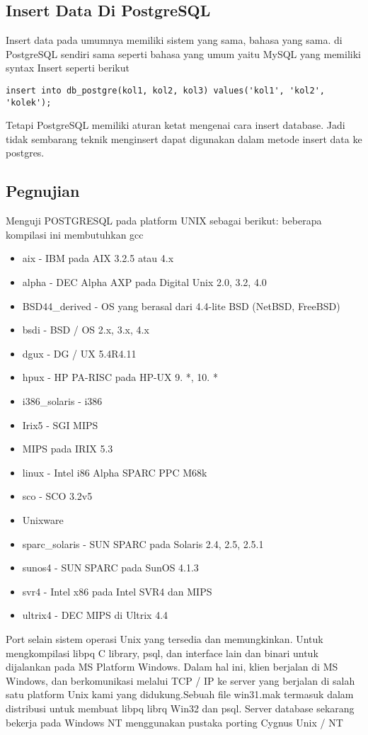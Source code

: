 \subsection{Insert Data Di PostgreSQL}
Insert data pada umumnya memiliki sistem yang sama, bahasa yang sama. di PostgreSQL sendiri sama seperti bahasa yang umum yaitu MySQL yang memiliki syntax Insert seperti berikut
\begin{verbatim}
insert into db_postgre(kol1, kol2, kol3) values('kol1', 'kol2', 'kolek');
\end{verbatim}
Tetapi PostgreSQL memiliki aturan ketat mengenai cara insert database. Jadi tidak sembarang teknik menginsert dapat digunakan dalam metode insert data ke postgres.

\subsection{Pegnujian}
Menguji POSTGRESQL pada platform UNIX sebagai berikut: 
beberapa kompilasi ini membutuhkan gcc
\begin {itemize} 
	\item aix - IBM pada AIX 3.2.5 atau 4.x
	\item alpha - DEC Alpha AXP pada Digital Unix 2.0, 3.2, 4.0
	\item BSD44_derived - OS yang berasal dari 4.4-lite BSD (NetBSD, FreeBSD)
	\item bsdi - BSD / OS 2.x, 3.x, 4.x
	\item dgux - DG / UX 5.4R4.11
	\item hpux - HP PA-RISC pada HP-UX 9. *, 10. *
	\item i386_solaris - i386
	\item Irix5 - SGI MIPS
	\item MIPS pada IRIX 5.3
	\item linux - Intel i86 Alpha SPARC PPC M68k
	\item sco - SCO 3.2v5
	\item Unixware
	\item sparc_solaris - SUN SPARC pada Solaris 2.4, 2.5, 2.5.1
	\item sunos4 - SUN SPARC pada SunOS 4.1.3
	\item svr4 - Intel x86 pada Intel SVR4 dan MIPS
	\item ultrix4 - DEC MIPS di Ultrix 4.4
\end {itemize}

Port selain sistem operasi Unix yang tersedia dan memungkinkan. 
Untuk mengkompilasi libpq C library, psql, dan interface lain dan binari untuk dijalankan pada MS Platform Windows. Dalam hal ini, klien berjalan di MS Windows, dan berkomunikasi melalui TCP / IP ke server yang berjalan di salah satu platform Unix kami yang didukung.Sebuah file win31.mak termasuk dalam distribusi untuk membuat libpq librq Win32 dan psql. 
Server database sekarang bekerja pada Windows NT menggunakan pustaka porting Cygnus Unix / NT

